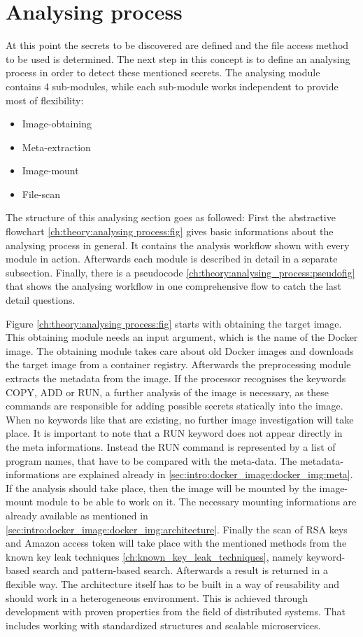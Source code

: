 \section{Analysing process}
\label{ch:theory:analysing_process}
At this point the secrets to be discovered are defined and the file access method to be used is determined. The next step in this concept is to define an analysing process in order to detect these mentioned secrets.
The analysing module contains 4 sub-modules, while each sub-module works independent to provide most of flexibility:
\begin{itemize}
\item Image-obtaining
\item Meta-extraction
\item Image-mount
\item File-scan
\end{itemize}

The structure of this analysing section goes as followed: First the abstractive flowchart \ref{ch:theory:analysing process:fig} gives basic informations about the analysing process in general. It contains the analysis workflow shown with every module in action. Afterwards each module is described in detail in a separate subsection.
Finally, there is a pseudocode \ref{ch:theory:analysing_process:pseudofig} that shows the analysing workflow in one comprehensive flow to catch the last detail questions.

Figure \ref{ch:theory:analysing process:fig} starts with obtaining the target image. This obtaining module needs an input argument, which is the name of the Docker image.
The obtaining module takes care about old Docker images and downloads the target image from a container registry. Afterwards the preprocessing module extracts the metadata from the image. If the processor recognises the keywords COPY, ADD or RUN, a further analysis of the image is necessary, as these commands are responsible for adding possible secrets statically into the image. When no keywords like that are existing, no further image investigation will take place. It is important to note that a RUN keyword does not appear directly in the meta informations. Instead the RUN command is represented by a list of program names, that have to be compared with the meta-data. The metadata-informations are explained already in \ref{sec:intro:docker_image:docker_img:meta}. If the analysis should take place, then the image will be mounted by the image-mount module to be able to work on it. The necessary mounting informations are already available as mentioned in \ref{sec:intro:docker_image:docker_img:architecture}. Finally the scan of RSA keys and Amazon access token will take place with the mentioned methods from the known key leak techniques \ref{ch:known_key_leak_techniques}, namely keyword-based search and pattern-based search. Afterwards a result is returned in a flexible way.
The architecture itself has to be built in a way of reusability and should work in a heterogeneous environment. This is achieved through development with proven properties from the field of distributed systems. That includes working with standardized structures and scalable microservices.

